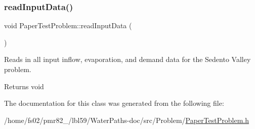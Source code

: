 \subsubsection{\texorpdfstring{read\+Input\+Data()}{readInputData()}}
{\footnotesize\ttfamily void Paper\+Test\+Problem\+::read\+Input\+Data (\begin{DoxyParamCaption}{ }\end{DoxyParamCaption})}



Reads in all input inflow, evaporation, and demand data for the Sedento Valley problem. 

\begin{DoxyReturn}{Returns}
void 
\end{DoxyReturn}


The documentation for this class was generated from the following file\+:\begin{DoxyCompactItemize}
\item 
/home/fs02/pmr82\+\_/lbl59/\+Water\+Paths-\/doc/src/\+Problem/\mbox{\hyperlink{PaperTestProblem_8h}{Paper\+Test\+Problem.\+h}}\end{DoxyCompactItemize}
